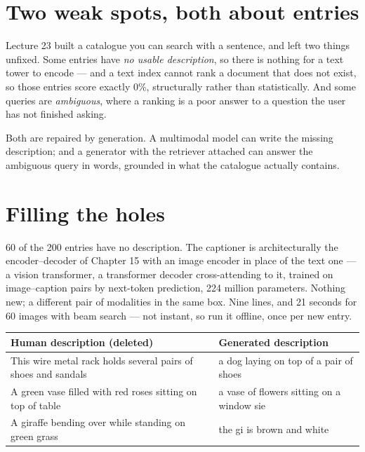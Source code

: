 \documentclass[11pt,a4paper]{article}
\begin{document}

\section{Two weak spots, both about entries}

Lecture 23 built a catalogue you can search with a sentence, and left two
things unfixed. Some entries have \emph{no usable description}, so there is
nothing for a text tower to encode --- and a text index cannot rank a document
that does not exist, so those entries score exactly 0\%, structurally rather
than statistically. And some queries are \emph{ambiguous}, where a ranking is a
poor answer to a question the user has not finished asking.

Both are repaired by generation. A multimodal model can write the missing
description; and a generator with the retriever attached can answer the
ambiguous query in words, grounded in what the catalogue actually contains.

\section{Filling the holes}

60 of the 200 entries have no description. The captioner is architecturally the
encoder--decoder of Chapter 15 with an image encoder in place of the text one
--- a vision transformer, a transformer decoder cross-attending to it, trained
on image--caption pairs by next-token prediction, 224 million parameters.
Nothing new; a different pair of modalities in the same box. Nine lines, and 21
seconds for 60 images with beam search --- not instant, so run it offline, once
per new entry.

\begin{center}
\small
\begin{tabular}{p{}p{}}
\toprule
\textbf{Human description (deleted)} & \textbf{Generated description} \\
\midrule
This wire metal rack holds several pairs of shoes and sandals &
a dog laying on top of a pair of shoes \\
A green vase filled with red roses sitting on top of table &
a vase of flowers sitting on a window sie \\
A giraffe bending over while standing on green grass &
the gi is brown and white \\
\bottomrule
\end{tabular}
\end{center}
\end{document}
